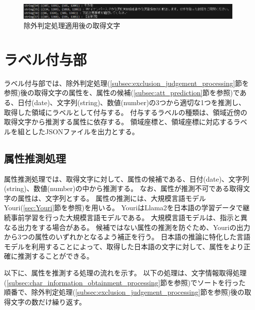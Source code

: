 \begin{figure}[t]
    \begin{center}
        \includegraphics[width=15cm]{image/04-implementation/after_exclusion_string.png}
        \caption{除外判定処理適用後の取得文字}
        \label{fig:after_exclusion_string}
    \end{center}
\end{figure}

\section{ラベル付与部}\label{sec:label_link_part}
ラベル付与部では、除外判定処理(\ref{subsec:exclusion_judgement_processing}節を参照)後の取得文字の属性を、属性の候補(\ref{subsec:att_prediction}節を参照)である、日付(date)、文字列(string)、数値(number)の3つから適切な1つを推測し、取得した領域にラベルとして付与する。
付与するラベルの種類は、領域近傍の取得文字から推測する属性に依存する。
領域座標と、領域座標に対応するラベルを組としたJSONファイルを出力とする。

\subsection{属性推測処理}\label{subsec:att_prediction_processing}
属性推測処理では、取得文字に対して、属性の候補である、日付(date)、文字列(string)、数値(number)の中から推測する。
なお、属性が推測不可である取得文字の属性は、文字列とする。
属性の推測には、大規模言語モデルYouri(\ref{sec:Youri}節を参照)を用いる。
YouriはLlama2を日本語の学習データで継続事前学習を行った大規模言語モデルである。
大規模言語モデルは、指示と異なる出力をする場合がある。
候補ではない属性の推測を防ぐため、Youriの出力から3つの属性のいずれかとなるよう補正を行う。
日本語の推論に特化した言語モデルを利用することによって、取得した日本語の文字に対して、属性をより正確に推測することができる。

以下に、属性を推測する処理の流れを示す。
以下の処理は、文字情報取得処理(\ref{subsec:char_information_obtainment_processing}節を参照)でソートを行った順番で、除外判定処理(\ref{subsec:exclusion_judgement_processing}節を参照)後の取得文字の数だけ繰り返す。

